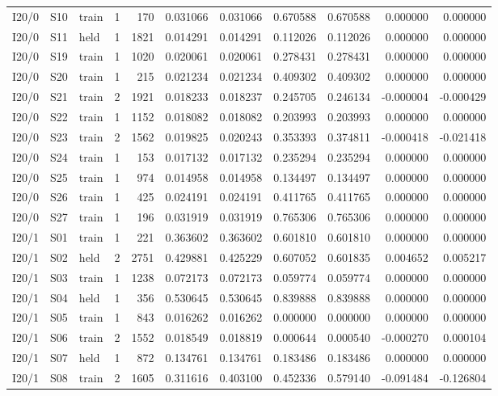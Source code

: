 {\begin{longtable}{@{}lllrrrrrrrr@{}}
I20/0 & S10 & train & 1 & 170 & 0.031066 & 0.031066 & 0.670588 & 0.670588 & 0.000000 & 0.000000 \\
I20/0 & S11 & held & 1 & 1821 & 0.014291 & 0.014291 & 0.112026 & 0.112026 & 0.000000 & 0.000000 \\
I20/0 & S19 & train & 1 & 1020 & 0.020061 & 0.020061 & 0.278431 & 0.278431 & 0.000000 & 0.000000 \\
I20/0 & S20 & train & 1 & 215 & 0.021234 & 0.021234 & 0.409302 & 0.409302 & 0.000000 & 0.000000 \\
I20/0 & S21 & train & 2 & 1921 & 0.018233 & 0.018237 & 0.245705 & 0.246134 & -0.000004 & -0.000429 \\
I20/0 & S22 & train & 1 & 1152 & 0.018082 & 0.018082 & 0.203993 & 0.203993 & 0.000000 & 0.000000 \\
I20/0 & S23 & train & 2 & 1562 & 0.019825 & 0.020243 & 0.353393 & 0.374811 & -0.000418 & -0.021418 \\
I20/0 & S24 & train & 1 & 153 & 0.017132 & 0.017132 & 0.235294 & 0.235294 & 0.000000 & 0.000000 \\
I20/0 & S25 & train & 1 & 974 & 0.014958 & 0.014958 & 0.134497 & 0.134497 & 0.000000 & 0.000000 \\
I20/0 & S26 & train & 1 & 425 & 0.024191 & 0.024191 & 0.411765 & 0.411765 & 0.000000 & 0.000000 \\
I20/0 & S27 & train & 1 & 196 & 0.031919 & 0.031919 & 0.765306 & 0.765306 & 0.000000 & 0.000000 \\
I20/1 & S01 & train & 1 & 221 & 0.363602 & 0.363602 & 0.601810 & 0.601810 & 0.000000 & 0.000000 \\
I20/1 & S02 & held & 2 & 2751 & 0.429881 & 0.425229 & 0.607052 & 0.601835 & 0.004652 & 0.005217 \\
I20/1 & S03 & train & 1 & 1238 & 0.072173 & 0.072173 & 0.059774 & 0.059774 & 0.000000 & 0.000000 \\
I20/1 & S04 & held & 1 & 356 & 0.530645 & 0.530645 & 0.839888 & 0.839888 & 0.000000 & 0.000000 \\
I20/1 & S05 & train & 1 & 843 & 0.016262 & 0.016262 & 0.000000 & 0.000000 & 0.000000 & 0.000000 \\
I20/1 & S06 & train & 2 & 1552 & 0.018549 & 0.018819 & 0.000644 & 0.000540 & -0.000270 & 0.000104 \\
I20/1 & S07 & held & 1 & 872 & 0.134761 & 0.134761 & 0.183486 & 0.183486 & 0.000000 & 0.000000 \\
I20/1 & S08 & train & 2 & 1605 & 0.311616 & 0.403100 & 0.452336 & 0.579140 & -0.091484 & -0.126804 \\

\end{longtable}}
